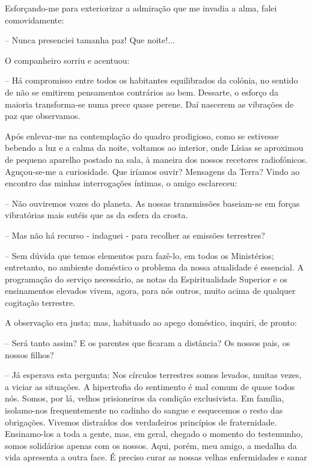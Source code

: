 \documentclass[portuguese,12pt,a4paper]{scrbook}
\begin{document}
	Esforçando-me para exteriorizar a admiração que me invadia a alma, falei comovidamente:
	
	– Nunca presenciei tamanha paz! Que noite!...
	
	O companheiro sorriu e acentuou:
	
	– Há compromisso entre todos os habitantes equilibrados da colónia, no sentido de não se emitirem pensamentos contrários ao bem. Dessarte, o esforço da maioria transforma-se numa prece quase perene. Daí nascerem as vibrações de paz que observamos.
	
	
	Após enlevar-me na contemplação do quadro prodigioso, como se estivesse bebendo a luz e a calma da noite, voltamos ao interior, onde Lísias se aproximou de pequeno aparelho postado na sala, à maneira dos nossos recetores radiofónicos. Aguçou-se-me a curiosidade. Que iríamos ouvir? Mensagens da Terra? Vindo ao encontro das minhas interrogações íntimas, o amigo esclareceu:
	
	– Não ouviremos vozes do planeta. As nossas transmissões baseiam-se em forças vibratórias mais sutéis que as da esfera da crosta.
	
	– Mas não há recurso - indaguei - para recolher as emissões terrestres?
	
	– Sem dúvida que temos elementos para fazê-lo, em todos os Ministérios; entretanto, no ambiente doméstico o problema da nossa atualidade é essencial. A programação do serviço necessário, as notas da Espiritualidade Superior e os ensinamentos elevados vivem, agora, para nós outros, muito acima de qualquer cogitação terrestre.
	
	A observação era justa; mas, habituado ao apego doméstico, inquiri, de pronto:
	
	– Será tanto assim? E os parentes que ficaram a distância? Os nossos pais, os nossos filhos?
	
	– Já esperava esta pergunta: Nos círculos terrestres somos levados, muitas vezes, a viciar as situações. A hipertrofia do sentimento é mal comum de quase todos nós. Somos, por lá, velhos prisioneiros da condição exclusivista. Em família, isolamo-nos frequentemente no cadinho do sangue e esquecemos o resto das obrigações. Vivemos distraídos dos verdadeiros princípios de fraternidade. Ensinamo-los a toda a gente, mas, em geral, chegado o momento do testemunho, somos solidários apenas com os nossos. Aqui, porém, meu amigo, a medalha da vida apresenta a outra face. É preciso curar as nossas velhas enfermidades e sanar
	
\end{document}
